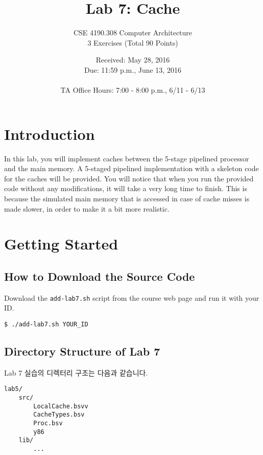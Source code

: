 \documentclass{article}
\begin{document}
\title{Lab 7: Cache}   %
\author{CSE 4190.308 Computer Architecture \\ 3 Exercises (Total 90 Points) }         
\date{Received: May 28, 2016 \\Due: 11:59 p.m., June 13, 2016\\ \ \\ TA Office
Hours: 7:00 - 8:00 p.m., 6/11 - 6/13}    %
\maketitle

\section{Introduction}
In this lab, you will implement caches between the 5-stage pipelined
processor and the main memory. A 5-staged pipelined implementation
with a skeleton code for the caches will be provided.
You will notice that when you run the provided code without any
modifications, it will take a very long time to finish. This is
because the simulated main memory that is accessed in case of cache
misses is made slower, in order to make it a bit more realistic.


\section{Getting Started}

\subsection{How to Download the Source Code}
Download the \texttt{add-lab7.sh} script from the course web page and run it with your ID.

\begin{Verbatim}[frame=single]
   $ ./add-lab7.sh YOUR_ID
\end{Verbatim}

\subsection{Directory Structure of Lab 7}
Lab 7 실습의 디렉터리 구조는 다음과 같습니다.

\begin{Verbatim}[frame=single]
lab5/
    src/	
        LocalCache.bsvv
        CacheTypes.bsv
        Proc.bsv
        y86
    lib/
        ...
\end{Verbatim}
\end{document}
